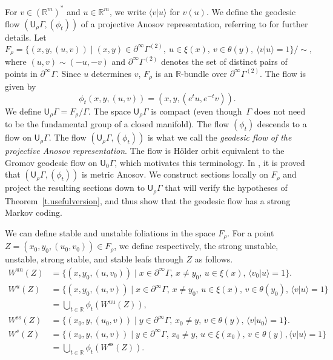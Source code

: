 \documentclass[JEP,XML,SOM,Unicode,NoFloatCountersInSection]{cedram}
\let\sep\mid
\newcommand{\sts}{\mathrm{ss}}
\newcommand{\uu}{\mathrm{uu}}
\theoremstyle{definition}
\numberwithin{equation}{section}
\begin{document}
For $v\in (\mathbb{R}^m)^*$ and $u\in\mathbb{R}^m$, we write $\langle v | u \rangle$ for $v(u)$. We define the geodesic flow $(\mathsf{U}_\rho\Gamma,(\phi_t))$ of a projective Anosov representation, referring to \cite[\S4]{bcls} for further details. Let\vspace*{-3pt}
\[ F_\rho = \bigl\{ (x,y,(u,v)) \sep (x,y)\in\partial^\infty\Gamma^{(2)}, \ u\in \xi(x), \ v\in \theta(y), \ \langle v|u\rangle =1\bigr\}\big/\sim,\]
where $(u,v)\sim(-u,-v)$ and $\partial^\infty\Gamma^{(2)}$ denotes the set of distinct pairs of points in $\partial^\infty\Gamma$. Since $u$ determines $v$, $F_\rho$ is an $\mathbb{R}$-bundle over $\partial^\infty\Gamma^{(2)}$. The flow is given by\vspace*{-3pt}
\[ \phi_t(x,y,(u,v)) = (x,y,(e^tu,e^{-t}v)).\]
We define $\mathsf{U}_\rho\Gamma = F_\rho/\Gamma$. The space $\mathsf{U}_\rho\Gamma$ is compact \cite[Prop.\,4.1]{bcls} (even though~$\Gamma$ does not need to be the fundamental group of a closed manifold). The flow $(\phi_t)$ \hbox{descends} to a flow on $\mathsf{U}_\rho\Gamma$. The flow $(\mathsf{U}_\rho\Gamma, (\phi_t))$ is what we call the \emph{geodesic flow of the projective Anosov representation}. The flow is Hölder orbit equivalent to the \hbox{Gromov} geodesic flow on $\mathsf{U}_0\Gamma$, which motivates this terminology. In \cite[Th.\,1.10]{bcls}, it is proved that $(\mathsf{U}_\rho\Gamma, (\phi_t))$ is metric Anosov. We construct sections locally on $F_\rho$ and project the resulting sections down to $\mathsf{U}_\rho\Gamma$ that will verify the hypotheses of Theorem~\ref{t.usefulversion}, and thus show that the geodesic flow has a strong Markov coding.

We can define stable and unstable foliations in the space $F_\rho$. For a point $Z=(x_0,y_0,(u_0,v_0))\in F_\rho$, we define respectively, the strong unstable, unstable, strong stable, and stable leafs through $Z$ as follows.\vspace*{-3pt}
\begin{align*}
W^{\uu}(Z) &=\{ (x,y_0,(u,v_0)) \sep x\in\partial^\infty\Gamma,\, x\neq y_0,\, u\in\xi(x),\, \langle v_0|u \rangle =1\}. \\
W^u(Z) &=\{ (x,y_0,(u,v)) \sep x\in\partial^\infty\Gamma,\, x\neq y_0,\, u\in\xi(x),\, v\in\theta(y_0),\, \langle v|u \rangle =1\} \\
& = \bigcup_{t\in\mathbb{R}} \phi_t(W^{\uu}(Z)), \\
W^{\sts}(Z) &=\{ (x_0,y,(u_0,v)) \sep y\in\partial^\infty\Gamma,\, x_0\neq y,\, v\in\theta(y),\, \langle v|u_0 \rangle =1\}. \\
W^s (Z) &=\{ (x_0,y,(u,v)) \sep y\in\partial^\infty\Gamma,\, x_0\neq y,\, u\in\xi(x_0),\, v\in\theta(y), \langle v|u \rangle =1\} \\
& = \bigcup_{t\in\mathbb{R}} \phi_t(W^{\sts}(Z)).
\end{align*}
\end{document}
